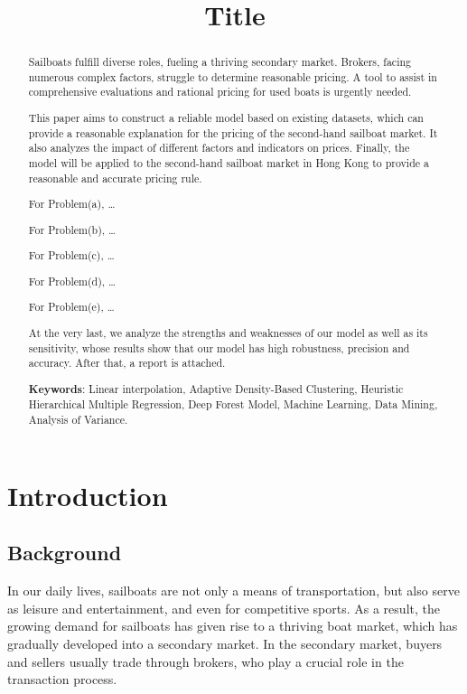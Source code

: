 \documentclass[12pt]{article}  %
\title{Title}  %
\begin{document}
\begin{abstract}
    Sailboats fulfill diverse roles, fueling a thriving secondary market. 
    Brokers, facing numerous complex factors, struggle to determine reasonable pricing. 
    A tool to assist in comprehensive evaluations and rational pricing for used boats is urgently needed.
    
    This paper aims to construct a reliable model based on existing datasets, 
    which can provide a reasonable explanation for the pricing of the second-hand sailboat market. 
    It also analyzes the impact of different factors and indicators on prices. 
    Finally, the model will be applied to the second-hand sailboat market in Hong Kong to provide a reasonable and accurate pricing rule.

    For Problem(a), \dots

    For Problem(b), \dots

    For Problem(c), \dots

    For Problem(d), \dots

    For Problem(e), \dots

    At the very last, we analyze the strengths and weaknesses of our model as well as its
sensitivity, whose results show that our model has high robustness, precision and accuracy.
After that, a report is attached.




    \vspace{5pt}
    \textbf{Keywords}:  Linear interpolation, Adaptive Density-Based Clustering, Heuristic Hierarchical Multiple Regression, Deep Forest Model,  Machine Learning, Data Mining, Analysis of Variance.
 

\end{abstract}

\maketitle  %
\tableofcontents  %


\section{Introduction}
\subsection{Background}
In our daily lives, sailboats are not only a means of transportation, but also serve as leisure and entertainment, and even for competitive sports. As a result, the growing demand for sailboats has given rise to a thriving boat market, which has gradually developed into a secondary market. In the secondary market, buyers and sellers usually trade through brokers, who play a crucial role in the transaction process.
\end{document}
